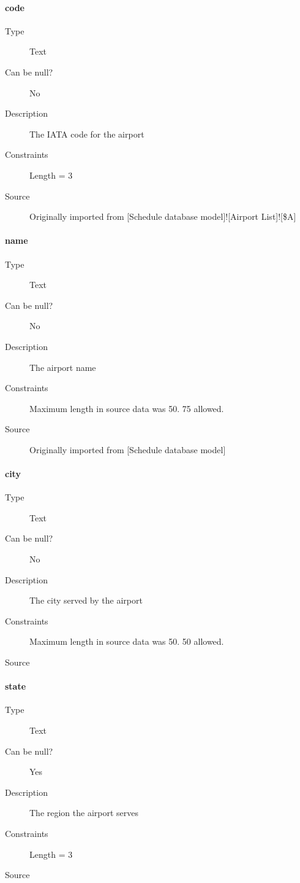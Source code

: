\documentclass[]{report}
\begin{document}
\paragraph{code}
	\begin{description}
	\item[Type]Text
	\item[Can be null?]No
	\item[Description]The IATA code for the airport
	\item[Constraints]Length = 3
	\item[Source]Originally imported from [Schedule database model]![Airport List]![\$A]
	\end{description}
\paragraph{name}
	\begin{description}
	\item[Type]Text
	\item[Can be null?]No
	\item[Description]The airport name
	\item[Constraints]Maximum length in source data was 50. 75 allowed.
	\item[Source]Originally imported from [Schedule database model]
	\end{description}
\paragraph{city}
	\begin{description}
	\item[Type]Text
	\item[Can be null?]No
	\item[Description]The city served by the airport
	\item[Constraints]Maximum length in source data was 50. 50 allowed.
	\item[Source]
	\end{description}
\paragraph{state}
	\begin{description}
	\item[Type]Text
	\item[Can be null?]Yes
	\item[Description]The region the airport serves
	\item[Constraints]Length = 3
	\item[Source]
	\end{description}
\end{document}
